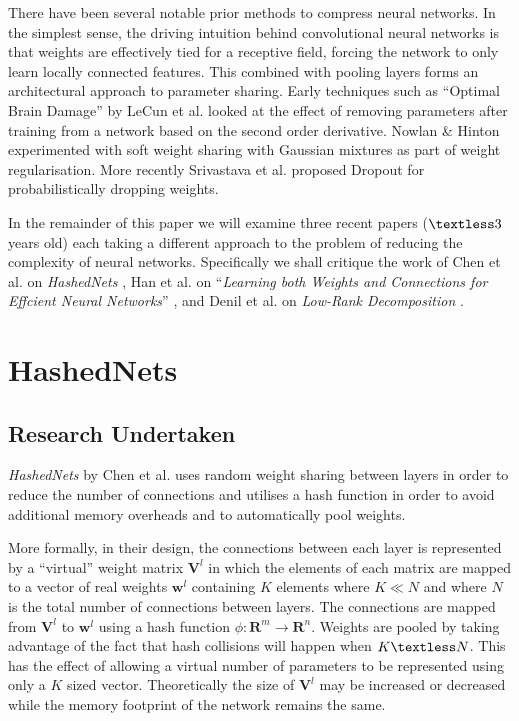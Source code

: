 \documentclass[journal]{IEEEtran}
\begin{document}
There have been several notable prior methods to compress neural networks. In the simplest sense, the driving intuition behind convolutional neural networks \cite{krizhevsky2012imagenet} is that weights are effectively tied for a receptive field, forcing the network to only learn locally connected features. This combined with pooling layers \cite{zeiler2013stochastic} forms an architectural approach to parameter sharing. Early techniques such as ``Optimal Brain Damage'' by LeCun et al. \cite{lecun1989optimal} looked at the effect of removing parameters after training from a network based on the second order derivative. Nowlan \& Hinton \cite{nowlan1992simplifying} experimented with soft weight sharing with Gaussian mixtures as part of weight regularisation. More recently Srivastava et al. \cite{srivastava2014dropout} proposed Dropout for probabilistically dropping weights.

In the remainder of this paper we will examine three recent papers ($\textless 3$ years old) each taking a different approach to the problem of reducing the complexity of neural networks. Specifically we shall critique the work of Chen et al. on \textit{HashedNets} \cite{chen2015compressing}, Han et al. on ``\textit{Learning both Weights and Connections for Effcient Neural Networks}'' \cite{han2015learning}, and Denil et al. on \textit{Low-Rank Decomposition} \cite{denil2013predicting}.

\section{HashedNets}
\label{sec:hashednets}

\subsection{Research Undertaken}
\textit{HashedNets} by Chen et al. \cite{chen2015compressing} uses random weight sharing between layers in order to reduce the number of connections and utilises a hash function in order to avoid additional memory overheads and to automatically pool weights. 

More formally, in their design, the connections between each layer is represented by a ``virtual'' weight matrix $\bm{V}^l$ in which the elements of each matrix are mapped to a vector of real weights $\bm{w}^l$ containing $K$ elements where $K \ll N$ and where $N$ is the total number of connections between layers. The connections are mapped from $\bm{V}^l$ to $\bm{w}^l$ using a hash function $\phi : \mathbf{R}^m \rightarrow \mathbf{R}^n$. Weights are pooled by taking advantage of the fact that hash collisions will happen when $K \textless N$. This has the effect of allowing a virtual number of parameters to be represented using only a $K$ sized vector. Theoretically the size of $\bm{V}^l$ may be increased or decreased while the memory footprint of the network remains the same.
\end{document}
